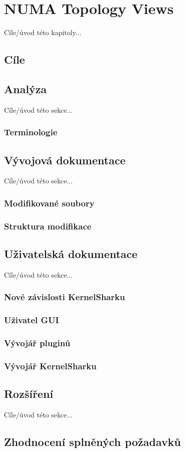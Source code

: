 \chapter{NUMA Topology Views}
Cíle/úvod této kapitoly...

\section{Cíle}


\section{Analýza}
Cíle/úvod této sekce...


\subsection{Terminologie}


\section{Vývojová dokumentace}
Cíle/úvod této sekce...

\subsection{Modifikované soubory}

\subsection{Struktura modifikace}

\section{Uživatelská dokumentace}
Cíle/úvod této sekce...

\subsection{Nové závislosti KernelSharku}

\subsection{Uživatel GUI}

\subsection{Vývojář pluginů}

\subsection{Vývojář KernelSharku}

\section{Rozšíření}
Cíle/úvod této sekce...

\section{Zhodnocení splněných požadavků}